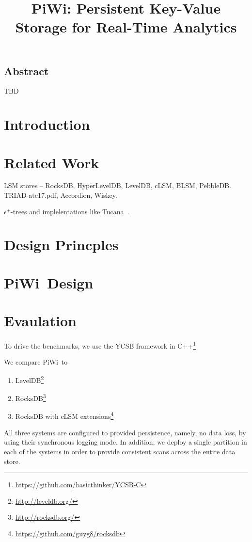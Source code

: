 \documentclass[letterpaper,twocolumn,10pt]{article}
\date{}
\newcommand{\sys}{PiWi}
\begin{document}
\title{\Large \bf \sys: Persistent Key-Value Storage for Real-Time Analytics} 
\author{}
\maketitle

\subsection*{Abstract}

TBD


\section{Introduction}


\section{Related Work}
\label{sec:related}

LSM stores -- RocksDB, HyperLevelDB, LevelDB, cLSM, BLSM, PebbleDB.
TRIAD-atc17.pdf, 
Accordion, 
Wiskey.

$\epsilon^+$-trees and implelentations like Tucana~\cite{tucana}.


\section{Design Princples}
\label{sec:principles}


\section{\sys\ Design}
\label{sec:design}



\section{Evaulation}
\label{sec:eval}

To drive the benchmarks, we use the 
YCSB framework in C++\footnote{\url{https://github.com/basicthinker/YCSB-C}}  

We compare \sys\ to 
\begin{enumerate}
\item
LevelDB\footnote{\url{http://leveldb.org/}}
\item
RocksDB\footnote{\url{http://rocksdb.org/}}
\item
RocksDB with cLSM extensions\footnote{\url{https://github.com/guyg8/rocksdb}}
\end{enumerate}
All three systems are configured to provided persistence, namely, no data loss, by using their synchronous logging mode.
In addition, we deploy a single partition in each of the systems in order to provide consistent scans across the entire data store.
\end{document}
